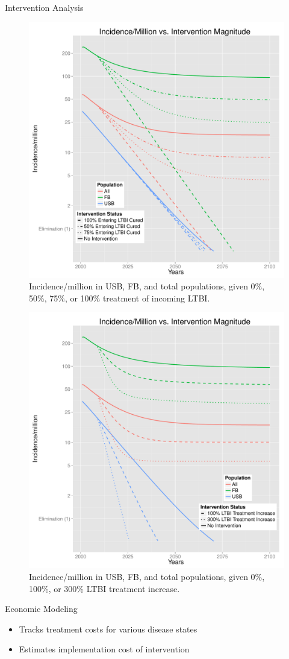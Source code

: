 \documentclass[final]{beamer}
\begin{document}
\begin{frame}
\begin{columns}[T]
\begin{column}{.3\textwidth}
      \begin{block}{Intervention Analysis}
        \begin{figure}[h]
          \begin{center}
            \includegraphics[height=.3\textwidth,width=.6\textwidth]{redEnLTBIIncGrouped}
          \end{center}
          \caption{Incidence/million in USB, FB, and total populations,
                   given 0\%, 50\%, 75\%, or 100\% treatment of incoming
                   LTBI.}
          \label{fig:redEnLTBI_incidence}
        \end{figure}
        \begin{figure}[h]
          \begin{center}
            \includegraphics[height=.3\textwidth,width=.6\textwidth]{incLTBItrmtIncGrouped}
          \end{center}
          \caption{Incidence/million in USB, FB, and total populations,
                   given 0\%, 100\%, or 300\% LTBI treatment increase.}
          \label{fig:incLTBItrmt_incidence}
        \end{figure}
      \end{block}
      \begin{block}{Economic Modeling}
        \begin{itemize}
          \item Tracks treatment costs for various disease states
          \item Estimates implementation cost of intervention
        \end{itemize}

\end{block}
\end{column}
\end{columns}
\end{frame}
\end{document}
